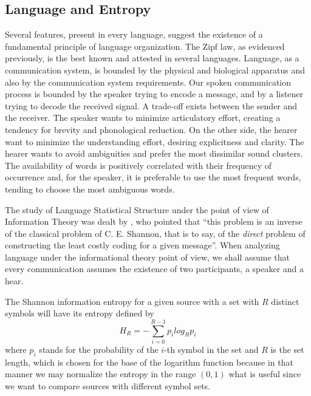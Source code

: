 \subsection{Language and Entropy}
Several features, present in every language, suggest the existence of
a fundamental principle of language organization. The Zipf law, as
evidenced previously, is the best known and attested in several languages.
Language, as a communication system, is bounded by the physical and biological
apparatus and also by the communication system requirements. Our spoken communication
process is bounded by the speaker trying to encode a message, and by a listener
trying to decode the received signal. A trade-off exists between the sender and
the receiver. The speaker wants to minimize articulatory effort, creating
a tendency for brevity and phonological reduction. On the other side, the
hearer want to minimize the understanding effort, desiring explicitness and clarity.
The hearer wants to avoid ambiguities and prefer the most dissimilar sound clusters.
The availability of words is positively correlated with their frequency of occurrence
and, for the speaker, it is preferable to use the most frequent words, tending to
choose the most ambiguous words. 


The study of Language Statistical Structure under the point of view of Information Theory
was dealt by \cite{mandelbrot1953}, who pointed that ``this problem is an inverse of the
classical problem of C. E. Shannon, that is to say, of the \textit{direct} problem of
constructing the least costly coding for a given message''. When analyzing language under
the informational theory point of view, we shall assume that every communication assumes
the existence of two participants, a speaker and a hear.

The Shannon information entropy for a given source with a set with $R$ distinct symbols
will have its entropy defined by
\begin{equation}
\label{eq:entropydef}
H_R = - \sum_{i=0}^{R-1} p_i log_R p_i
\end{equation}
where $p_i$ stands for the probability of the $i$-th symbol in the set and
$R$ is the set length, which is chosen for the base of the logarithm function
because in that manner we may normalize the entropy in the range $(0,1)$
what is useful since we want to compare sources with different symbol sets.

